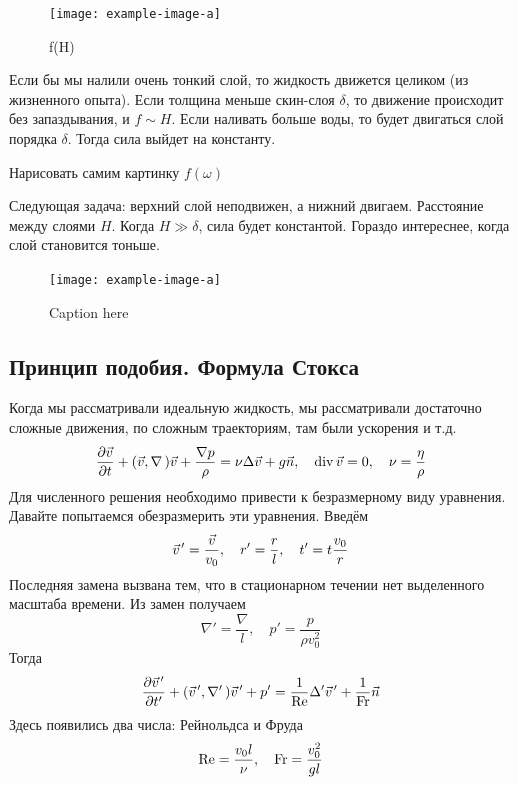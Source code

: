 \begin{figure}[tb]
    \centering
    \texttt{[image: example-image-a]}
    \caption{f(H)}
    \label{fig:figure1}
\end{figure}

Если бы мы налили очень тонкий слой, то жидкость движется целиком (из жизненного опыта). Если толщина меньше скин-слоя $\delta$, то движение происходит без запаздывания, и $f \sim H$. Если наливать больше воды, то будет двигаться слой порядка $\delta$. Тогда сила выйдет на константу.

Нарисовать самим картинку $f(\omega)$

Следующая задача: верхний слой неподвижен, а нижний двигаем. Расстояние между слоями $H$. Когда $H \gg \delta$, сила будет константой. Гораздо интереснее, когда слой становится тоньше.

\begin{figure}[tb]
    \centering
    \texttt{[image: example-image-a]}
    \caption{Caption here}
    \label{fig:figure1}
\end{figure}

\subsection{Принцип подобия. Формула Стокса}
Когда мы рассматривали идеальную жидкость, мы рассматривали достаточно сложные движения, по сложным траекториям, там были ускорения и т.д.
\begin{equation}
    \pdv{\vec{v}}{t}+(\vec{v},\nabla\,)\vec{v}+\frac{\nabla p}{\rho}=
    \nu \Delta \vec{v} + g \vec{n}, \quad
    \operatorname{div} \vec{v} = 0, \quad \nu=\frac{\eta}{\rho}
\end{equation}
Для численного решения необходимо привести к безразмерному виду уравнения. Давайте попытаемся обезразмерить эти уравнения. Введём
\begin{equation}
    \pvec{v}' = \frac{\vec{v}}{v_0}, \quad
    r' = \frac{r}{l}, \quad
    t' = t \frac{v_0}{r}
\end{equation}
Последняя замена вызвана тем, что в стационарном течении нет выделенного масштаба времени.
Из замен получаем
\begin{equation}
    \nabla' = \frac{\nabla}{l},\quad
    p'=\frac{p}{\rho v_0^2}
\end{equation}
Тогда
\begin{equation}
    \pdv{\pvec{v}'}{t'}+(\pvec{v}', \nabla'\,)\pvec{v}' + p'=
    \frac{1}{\Re}\Delta' \pvec{v}' + \frac{1}{\Fr} \vec{n}
\end{equation}
Здесь появились два числа: Рейнольдса и Фруда
\begin{equation}
    \Re=\frac{v_0 l}{\nu}, \quad
    \operatorname{Fr}=\frac{v_0^2}{gl}
\end{equation}

